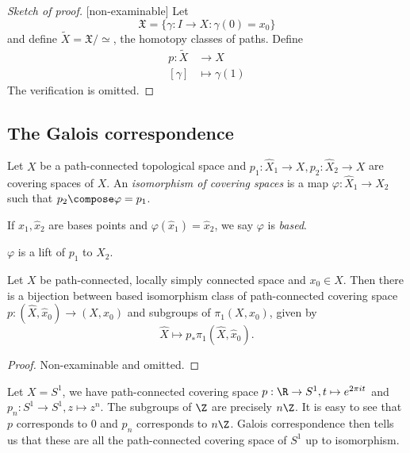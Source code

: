 \documentclass[a4paper]{article}
\begin{document}
\begin{proof}[Sketch of proof][non-examinable]
  Let
  \[
    \mathfrak X = \{\gamma: I \to X: \gamma(0) = x_0\}
  \]
  and define \(\tilde X = \mathfrak X /\simeq\), the homotopy classes of paths. Define
  \begin{align*}
    p: \tilde X &\to X \\
    [\gamma] &\mapsto \gamma(1)
  \end{align*}
  The verification is omitted.
\end{proof}

\subsection{The Galois correspondence}

\begin{definition}
  Let \(X\) be a path-connected topological space and \(p_1: \hat X_1 \to X, p_2: \hat X_2 \to X\) are covering spaces of \(X\). An \emph{isomorphism of covering spaces} is a map \(\varphi: \hat X_1 \to \hat X_2\) such that \(p_2 \compose \varphi = p_1\).

  If \(\hat x_1, \hat x_2\) are bases points and \(\varphi(\hat x_1) = \hat x_2\), we say \(\varphi\) is \emph{based}.
\end{definition}

\begin{remark}
  \(\varphi\) is a lift of \(p_1\) to \(\hat X_2\).
\end{remark}

\begin{theorem}
  Let \(X\) be path-connected, locally simply connected space and \(x_0 \in X\). Then there is a bijection between based isomorphism class of path-connected covering space \(p: (\hat X, \hat x_0) \to (X, x_0)\) and subgroups of \(\pi_1(X,x_0)\), given by
  \[
    \hat X \mapsto p_*\pi_1(\hat X, \hat x_0).
  \]
\end{theorem}

\begin{proof}
  Non-examinable and omitted.
\end{proof}

\begin{eg}
  Let \(X = S^1\), we have path-connected covering space \(p: \R \to S^1, t \mapsto e^{2\pi it}\) and \(p_n: S^1 \to S^1, z \mapsto z^n\). The subgroups of \(\Z\) are precisely \(n\Z\). It is easy to see that \(p\) corresponds to \(0\) and \(p_n\) corresponds to \(n\Z\). Galois correspondence then tells us that these are all the path-connected covering space of \(S^1\) up to isomorphism.
\end{eg}
\end{document}
